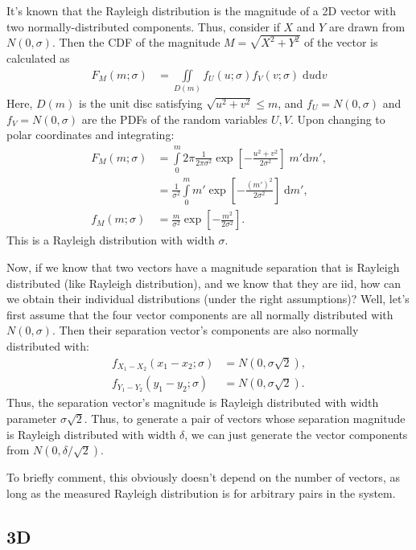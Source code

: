 \documentclass[12pt]{article}
\newcommand*{\p}[1]{\left(#1\right)}
\newcommand*{\s}[1]{\left[#1\right]}
\begin{document}
It's known that the Rayleigh distribution is the magnitude of a 2D vector with
two normally-distributed components. Thus, consider if $X$ and $Y$ are drawn
from $N\p{0, \sigma}$. Then the CDF of the magnitude $M = \sqrt{X^2 + Y^2}$ of
the vector is calculated as
\begin{align}
    F_M(m; \sigma) &= \iint\limits_{D(m)}f_U(u; \sigma)
        f_V(v; \sigma)\;\mathrm{d}u\mathrm{d}v
\end{align}
Here, $D(m)$ is the unit disc satisfying $\sqrt{u^2 + v^2} \leq m$, and $f_U =
N(0, \sigma)$ and $f_V = N(0, \sigma)$ are the PDFs of the random variables $U,
V$. Upon changing to polar coordinates and integrating:
\begin{align}
    F_M(m; \sigma) &= \int\limits_0^m 2\pi
        \frac{1}{2\pi \sigma^2}\exp\s{-\frac{u^2 + v^2}{2\sigma^2}}
            \;m'\mathrm{d}m',\\
        &= \frac{1}{\sigma^2}\int\limits_0^m m'\exp\s{-\frac{(m')^2}{2\sigma^2}}
            \;\mathrm{d}m',\\
    f_M(m; \sigma) &= \frac{m}{\sigma^2}\exp\s{-\frac{m^2}{2\sigma^2}}.
\end{align}
This is a Rayleigh distribution with width $\sigma$.

Now, if we know that two vectors have a magnitude separation that is Rayleigh
distributed (like Rayleigh distribution), and we know that they are iid, how can
we obtain their individual distributions (under the right assumptions)? Well,
let's first assume that the four vector components are all normally distributed
with $N\p{0, \sigma}$. Then their separation vector's components are also
normally distributed with:
\begin{align}
    f_{X_1 - X_2}\p{x_1 - x_2; \sigma} &= N\p{0, \sigma\sqrt{2}},\\
    f_{Y_1 - Y_2}\p{y_1 - y_2; \sigma} &= N\p{0, \sigma\sqrt{2}}.
\end{align}
Thus, the separation vector's magnitude is Rayleigh distributed with width
parameter $\sigma \sqrt{2}$. Thus, to generate a pair of vectors whose
separation magnitude is Rayleigh distributed with width $\delta$, we can just
generate the vector components from $N\p{0, \delta / \sqrt{2}}$.

To briefly comment, this obviously doesn't depend on the number of vectors, as
long as the measured Rayleigh distribution is for arbitrary pairs in the system.

\subsection{3D}
\end{document}
